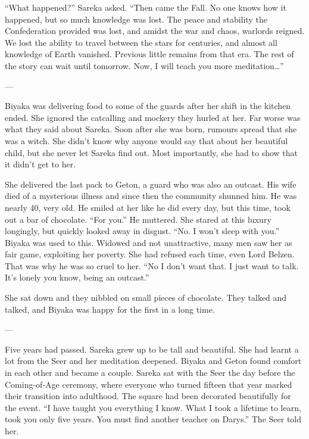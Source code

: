“What happened?” Sareka asked. “Then came the Fall. No one knows how it happened, but so much knowledge was lost. The peace and stability the Confederation provided was lost, and amidst the war and chaos, warlords reigned. We lost the ability to travel between the stars for centuries, and almost all knowledge of Earth vanished. Previous little remains from that era. The rest of the story can wait until tomorrow. Now, I will teach you more meditation…”

---

Biyaka was delivering food to some of the guards after her shift in the kitchen ended. She ignored the catcalling and mockery they hurled at her. Far worse was what they said about Sareka. Soon after she was born, rumours spread that she was a witch. She didn’t know why anyone would say that about her beautiful child, but she never let Sareka find out. Most importantly, she had to show that it didn’t get to her.

She delivered the last pack to Geton, a guard who was also an outcast. His wife died of a mysterious illness and since then the community shunned him. He was nearly 40, very old. He smiled at her like he did every day, but this time, took out a bar of chocolate. “For you.” He muttered. She stared at this luxury longingly, but quickly looked away in disgust. “No. I won’t sleep with you.” Biyaka was used to this. Widowed and not unattractive, many men saw her as fair game, exploiting her poverty. She had refused each time, even Lord Belzen. That was why he was so cruel to her. “No I don’t want that. I just want to talk. It’s lonely you know, being an outcast.”

She sat down and they nibbled on small pieces of chocolate. They talked and talked, and Biyaka was happy for the first in a long time.

---

Five years had passed. Sareka grew up to be tall and beautiful. She had learnt a lot from the Seer and her meditation deepened. Biyaka and Geton found comfort in each other and became a couple. Sareka sat with the Seer the day before the Coming-of-Age ceremony, where everyone who turned fifteen that year marked their transition into adulthood. The square had been decorated beautifully for the event. “I have taught you everything I know. What I took a lifetime to learn, took you only five years. You must find another teacher on Darys.” The Seer told her.

